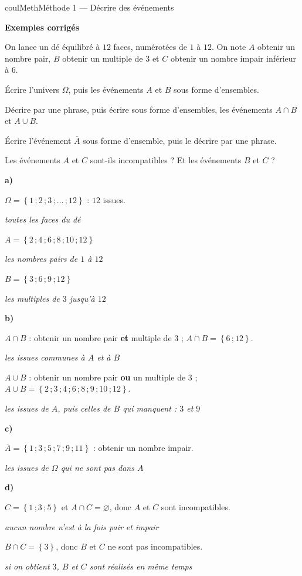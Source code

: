 \documentclass[11pt,a4paper]{article}
\makeatletter
\newcommand{\lycee@ens}[1]{\left\{#1\right\}}
\providecommand{\ens}{\lycee@ens}}
\newcounter{lycee@signet}
\newcommand{\signet}[3][]{\stepcounter{lycee@signet}%
  \edef\lycee@dest{\if\relax\detokenize{#1}\relax
    signet.\arabic{lycee@signet}\else#1\fi}%
  \hypertarget{\lycee@dest}{}\bookmark[level=#2,dest=\lycee@dest]{#3}}
\newcommand{\res}[1]{#1}
\newcounter{methode}
\newenvironment{methodebox}[1][Méthode]{\stepcounter{methode}%
  \begin{boitecours}[phantom={\signet[methode-\arabic{methode}]{2}{#1}}]{coulMeth}{#1}}%
  {\end{boitecours}}
\newcommand{\etape}[1]{\par\smallskip\textbf{\color{coulMeth}#1}\par\nobreak\smallskip}
\newcommand{\explique}[2]{\par\smallskip\noindent
  \begin{minipage}[t]{0.57\linewidth}\raggedright #1\end{minipage}\hfill
  \begin{minipage}[t]{0.40\linewidth}\raggedright\leavevmode
    {\small\itshape\color{black!60}#2}\end{minipage}\par}
\newcommand{\cas}[1]{\par\smallskip\noindent\textbf{\color{coulExo}#1}\vadjust{\nobreak}}
\newenvironment{correction}{\par}{\par}
\newcommand{\etapeexemples}{\etape{Exemples corrigés}}
\makeatother
\begin{document}
\begin{methodebox}[Méthode 1 --- Décrire des événements]
\etapeexemples
On lance un dé équilibré à $12$ faces, numérotées de $1$ à $12$. On note $A$ \og obtenir un
nombre pair\fg{}, $B$ \og obtenir un multiple de $3$\fg{} et $C$ \og obtenir un nombre impair
inférieur à $6$\fg{}.
\begin{questions}[label=\alph*)]
  \item Écrire l'univers $\Omega$, puis les événements $A$ et $B$ sous forme d'ensembles.
  \item Décrire par une phrase, puis écrire sous forme d'ensembles, les événements $A\cap B$
        et $A\cup B$.
  \item Écrire l'événement $\overline{A}$ sous forme d'ensemble, puis le décrire par une phrase.
  \item Les événements $A$ et $C$ sont-ils incompatibles ? Et les événements $B$ et $C$ ?
\end{questions}
\begin{correction}
\cas{a)}
\explique{$\Omega=\res{\ens{1\,;2\,;3\,;\dots\,;12}}$ : $12$ issues.}{toutes les faces du dé}
\explique{$A=\res{\ens{2\,;4\,;6\,;8\,;10\,;12}}$}{les nombres pairs de $1$ à $12$}
\explique{$B=\res{\ens{3\,;6\,;9\,;12}}$}{les multiples de $3$ jusqu'à $12$}
\cas{b)}
\explique{$A\cap B$ : \og obtenir un nombre pair \textbf{et} multiple de $3$\fg{} ;
$A\cap B=\res{\ens{6\,;12}}$.}{les issues communes à $A$ et à $B$}
\explique{$A\cup B$ : \og obtenir un nombre pair \textbf{ou} un multiple de $3$\fg{} ;
$A\cup B=\res{\ens{2\,;3\,;4\,;6\,;8\,;9\,;10\,;12}}$.}{les issues de $A$, puis celles de $B$
qui manquent : $3$ et $9$}
\cas{c)}
\explique{$\overline{A}=\res{\ens{1\,;3\,;5\,;7\,;9\,;11}}$ : \og obtenir un nombre
\res{impair}\fg{}.}{les issues de $\Omega$ qui ne sont pas dans $A$}
\cas{d)}
\explique{$C=\ens{1\,;3\,;5}$ et $A\cap C=\varnothing$, donc \res{$A$ et $C$ sont
incompatibles}.}{aucun nombre n'est à la fois pair et impair}
\explique{$B\cap C=\ens{3}$, donc \res{$B$ et $C$ ne sont pas incompatibles}.}{si on
obtient $3$, $B$ et $C$ sont réalisés en même temps}
\end{correction}


\end{methodebox}
\end{document}

